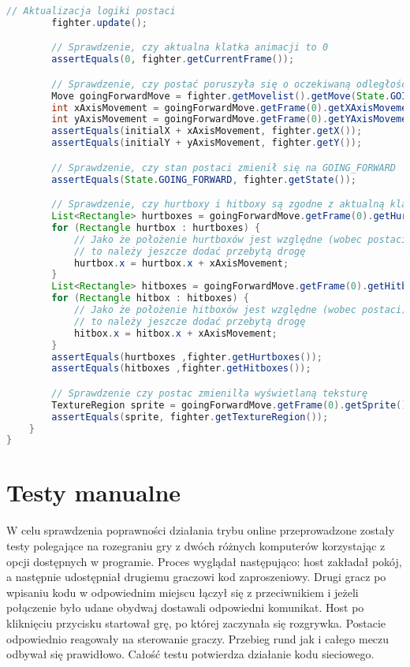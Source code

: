 \begin{lstlisting}[language=Java,style=JavaStyle,label=list:FighterTest,caption=Test metody \texttt{update} z klasy \texttt{Fighter},
                   basicstyle=\footnotesize\ttfamily]
        // Aktualizacja logiki postaci
        fighter.update();

        // Sprawdzenie, czy aktualna klatka animacji to 0
        assertEquals(0, fighter.getCurrentFrame());

        // Sprawdzenie, czy postać poruszyła się o oczekiwaną odległość
        Move goingForwardMove = fighter.getMovelist().getMove(State.GOING_FORWARD.getId());
        int xAxisMovement = goingForwardMove.getFrame(0).getXAxisMovement();
        int yAxisMovement = goingForwardMove.getFrame(0).getYAxisMovement();
        assertEquals(initialX + xAxisMovement, fighter.getX());
        assertEquals(initialY + yAxisMovement, fighter.getY());

        // Sprawdzenie, czy stan postaci zmienił się na GOING_FORWARD
        assertEquals(State.GOING_FORWARD, fighter.getState());

        // Sprawdzenie, czy hurtboxy i hitboxy są zgodne z aktualną klatką ruchu
        List<Rectangle> hurtboxes = goingForwardMove.getFrame(0).getHurtboxes();
        for (Rectangle hurtbox : hurtboxes) {
            // Jako że położenie hurtboxów jest względne (wobec postaci)
            // to należy jeszcze dodać przebytą drogę
            hurtbox.x = hurtbox.x + xAxisMovement;
        }
        List<Rectangle> hitboxes = goingForwardMove.getFrame(0).getHitboxes();
        for (Rectangle hitbox : hitboxes) {
            // Jako że położenie hitboxów jest względne (wobec postaci)
            // to należy jeszcze dodać przebytą drogę
            hitbox.x = hitbox.x + xAxisMovement;
        }
        assertEquals(hurtboxes ,fighter.getHurtboxes());
        assertEquals(hitboxes ,fighter.getHitboxes());

        // Sprawdzenie czy postac zmienilła wyświetlaną teksturę
        TextureRegion sprite = goingForwardMove.getFrame(0).getSprite();
        assertEquals(sprite, fighter.getTextureRegion());
    }
}
\end{lstlisting}

\section{Testy manualne}
W celu sprawdzenia poprawności działania trybu online przeprowadzone zostały testy polegające na rozegraniu gry z dwóch różnych komputerów korzystając z opcji dostępnych w programie. Proces wyglądał następująco: host zakładał pokój, a następnie udostępniał drugiemu graczowi kod zaproszeniowy. Drugi gracz po wpisaniu kodu w odpowiednim miejscu łączył się z przeciwnikiem i jeżeli połączenie było udane obydwaj dostawali odpowiedni komunikat. Host po kliknięciu przycisku startował grę, po której zaczynała się rozgrywka. Postacie odpowiednio reagowały na sterowanie graczy. Przebieg rund jak i całego meczu odbywał się prawidłowo. Całość testu potwierdza działanie kodu sieciowego.


